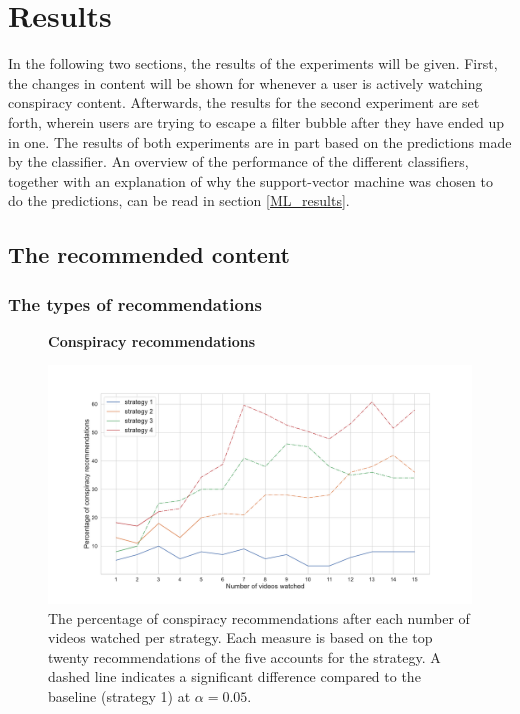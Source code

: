 \documentclass[../main.tex]{subfiles}
\begin{document}
\section{Results}
In the following two sections, the results of the experiments will be given. First, the changes in content 
will be shown for whenever a user is actively watching conspiracy content. Afterwards, the results for the
second experiment are set forth, wherein users are trying to escape a filter bubble after they have ended 
up in one. The results of both experiments are in part based on the predictions made by the classifier. An 
overview of the performance of the different classifiers, together with an explanation of why the 
support-vector machine was chosen to do the predictions, can be read in section \ref{ML_results}.

\subsection{The recommended content}
\subsubsection{The types of recommendations}
\begin{figure}[h]
  \textbf{Conspiracy recommendations}\par\medskip
  \centering
  \includegraphics[keepaspectratio, width=\textwidth]{images/conspiracy_recs.pdf}
  \caption{The percentage of conspiracy recommendations after each number of videos watched per strategy. Each measure is based on the top twenty recommendations of the five accounts for the strategy. A dashed line indicates a significant difference compared to the baseline (strategy 1) at $\alpha = 0.05$.}
  \label{fig:con_recs}
\end{figure}
\end{document}
